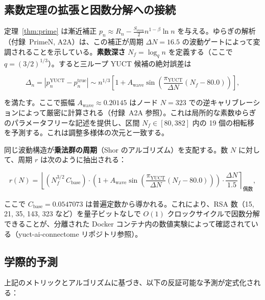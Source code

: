 \documentclass[12pt,a4paper]{article}
\newcommand{\piYUCT}{\pi_{\mathrm{YUCT}}}
\theoremstyle{remark}
\begin{document}
	\subsection{素数定理の拡張と因数分解への接続}
	\label{subsec:prime-extension}
	
	定理~\ref{thm:prime} は漸近補正 \(p_n \approx R_n - \frac{S_{\mathrm{even}}}{2} n^{1-\beta}\ln n\) を与える。ゆらぎの解析（付録~PrimeN, A2A）は、この補正が周期 \(\Delta N = 16.5\) の波動ゲートによって変調されることを示している。\textbf{素数深さ} \(N_f = \log_q n\) を定義する（ここで \(q = (3/2)^{1/3}\)）。すると三ループ YUCT 候補の絶対誤差は
	
	\begin{equation}
		\Delta_n = \left| p_n^{\mathrm{YUCT}} - p_n^{\mathrm{true}} \right|
		\sim n^{1/3} \left[ 1 + A_{\text{wave}} \sin\!\left( \frac{\piYUCT}{\Delta N} (N_f - 80.0) \right) \right],
		\label{eq:prime_wave}
	\end{equation}
	
	を満たす。ここで振幅 \(A_{\text{wave}} \approx 0.20145\) はノード \(N=323\) での逆キャリブレーションによって厳密に計算される（付録~A2A 参照）。これは局所的な素数ゆらぎのパラメータフリーな記述を提供し、区間 \(N_f \in [80, 382]\) 内の 19 個の相転移を予測する。これは調整多様体の次元と一致する。
	
	同じ波動構造が\textbf{乗法群の周期}（Shor のアルゴリズム）を支配する。数 \(N\) に対して、周期 \(r\) は次のように抽出される：
	
	\begin{equation}
		r(N) = \left\lfloor (N_f^{3/2} \, C_{\text{base}}) \cdot
		\left(1 + A_{\text{wave}} \sin\left( \frac{\piYUCT}{\Delta N} (N_f - 80.0) \right) \right) \cdot \frac{\Delta N}{1.5} \right\rceil_{\text{偶数}},
		\label{eq:shor_period}
	\end{equation}
	
	ここで \(C_{\text{base}} = 0.0547073\) は普遍定数から導かれる。これにより、RSA 数（15, 21, 35, 143, 323 など）を量子ビットなしで \(O(1)\) クロックサイクルで因数分解できることが、分離された Docker コンテナ内の数値実験によって確認されている（yuct-ai-connectome リポジトリ参照）。
	
	\subsection{学際的予測}
	\label{subsec:predictions-complexity}
	
	上記のメトリックとアルゴリズムに基づき、以下の反証可能な予測が定式化される：
	
\end{document}

